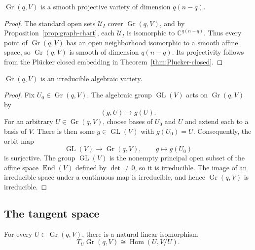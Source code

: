 \documentclass{siamonline250211}
\newcommand{\CC}{\mathbb C}
\newcommand{\Gr}{\operatorname{Gr}}
\newcommand{\Hom}{\operatorname{Hom}}
\newcommand{\cU}{\mathcal U}
\begin{document}
\begin{corollary}\label{cor:Gr-smooth-dim}
$\Gr(q,V)$ is a smooth projective variety of dimension $q(n-q)$.
\end{corollary}

\begin{proof}
The standard open sets $\cU_I$ cover $\Gr(q,V)$, and by
Proposition~\ref{prop:graph-chart}, each $\cU_I$ is isomorphic to
$\CC^{q(n-q)}$. Thus every point of $\Gr(q,V)$ has an open neighborhood
isomorphic to a smooth affine space, so $\Gr(q,V)$ is smooth of dimension
$q(n-q)$. Its projectivity follows from the Pl\"ucker closed embedding in
Theorem~\ref{thm:Plucker-closed}.
\end{proof}

\begin{lemma}\label{lem:Gr-irreducible}
$\Gr(q,V)$ is an irreducible algebraic variety.
\end{lemma}

\begin{proof}
Fix $U_0\in\Gr(q,V)$. The algebraic group $\operatorname{GL}(V)$ acts on
$\Gr(q,V)$ by
\[
  (g,U)\longmapsto g(U).
\]
For an arbitrary $U\in\Gr(q,V)$, choose bases of $U_0$ and $U$ and extend each
to a basis of $V$. There is then some $g\in\operatorname{GL}(V)$ with
$g(U_0)=U$. Consequently, the orbit map
\[
  \operatorname{GL}(V)\longrightarrow\Gr(q,V),
  \qquad g\longmapsto g(U_0)
\]
is surjective. The group $\operatorname{GL}(V)$ is the nonempty principal open
subset of the affine space $\operatorname{End}(V)$ defined by $\det\neq0$, so it
is irreducible. The image of an irreducible space under a continuous map is
irreducible, and hence $\Gr(q,V)$ is irreducible.
\end{proof}

\subsection{The tangent space}

\begin{theorem}\label{thm:tangent-Gr}
For every $U\in\Gr(q,V)$, there is a natural linear isomorphism
\begin{equation}\label{eq:tangent-Gr}
  T_U\Gr(q,V)\cong\Hom(U,V/U).
\end{equation}
\end{theorem}
\end{document}
